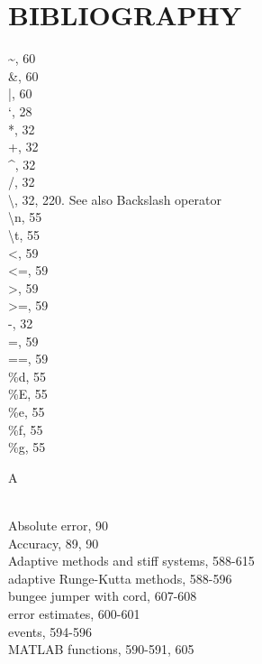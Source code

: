 \documentclass[../main.tex]{subfiles}
\begin{document}
\chapter*{BIBLIOGRAPHY}

\begin{multicols}{3}

    \noindent\~{}, 60\\
    \&, 60\\
    |, 60\\
    `, 28\\
    *, 32\\
    +, 32\\
    \^{}, 32\\
    /, 32\\
    \textbackslash, 32, 220. See also Backslash operator\\
    \textbackslash n, 55\\
    \textbackslash t, 55\\
    <, 59\\
    <=, 59\\
    >, 59\\
    >=, 59\\
    -, 32\\
    =, 59\\
    ==, 59\\
    \%d, 55\\
    \%E, 55\\
    \%e, 55\\
    \%f, 55\\
    \%g, 55\vspace*{2mm}\\
    \begin{huge} A \end{huge}\\
    Absolute error, 90\\
    Accuracy, 89, 90\\
    Adaptive methods and stiff systems, 588-615\\
    \hspace*{3mm}adaptive Runge-Kutta methods, 588-596\\
    \hspace*{3mm}bungee jumper with cord, 607-608\\
    \hspace*{3mm}error estimates, 600-601\\
    \hspace*{3mm}events, 594-596\\
    \hspace*{3mm}MATLAB functions, 590-591, 605\\

\end{multicols}
\end{document}
